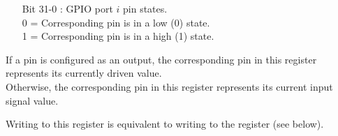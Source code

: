 \vspace{-2mm}
\begin{itemize}[leftmargin=18mm,labelsep=3mm,parsep=1.5mm]
    \item[\footnotesize Bit 31-0] : GPIO port $i$ pin states.\\{\footnotesize
    0 = Corresponding pin is in a low (0) state.\\
    1 = Corresponding pin is in a high (1) state.}
\end{itemize}
If a pin is configured as an output, the corresponding pin in this register represents its currently driven value.\\
Otherwise, the corresponding pin in this register represents its current input signal value.

Writing to this register is equivalent to writing to the  register (see below).


